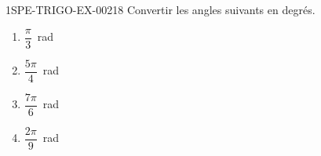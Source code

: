 \begin{exercice}{1SPE-TRIGO-EX-002}{1}{8}
Convertir les angles suivants en degrés.
\begin{enumerate}
  \item $\dfrac{\pi}{3}$~rad
  \item $\dfrac{5\pi}{4}$~rad
  \item $\dfrac{7\pi}{6}$~rad
  \item $\dfrac{2\pi}{9}$~rad
\end{enumerate}
\end{exercice}
